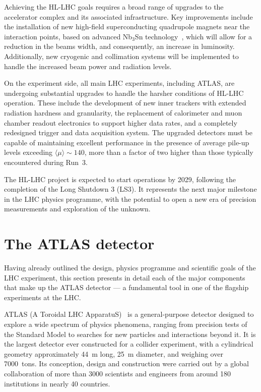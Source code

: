 Achieving the HL-LHC goals requires a broad range of upgrades to the accelerator complex and its associated infrastructure. Key improvements include the installation of new high-field superconducting quadrupole magnets near the interaction points, based on advanced Nb$_3$Sn technology~\cite{Mangiarotti:2770766}, which will allow for a reduction in the beams width, and consequently, an increase in luminosity. Additionally, new cryogenic and collimation systems will be implemented to handle the increased beam power and radiation levels.

On the experiment side, all main LHC experiments, including ATLAS, are undergoing substantial upgrades to handle the harsher conditions of HL-LHC operation. These include the development of new inner trackers with extended radiation hardness and granularity, the replacement of calorimeter and muon chamber readout electronics to support higher data rates, and a completely redesigned trigger and data acquisition system. The upgraded detectors must be capable of maintaining excellent performance in the presence of average pile-up levels exceeding $\langle\mu\rangle \sim 140$, more than a factor of two higher than those typically encountered during Run~3.

The HL-LHC project is expected to start operations by 2029, following the completion of the Long Shutdown 3 (LS3). It represents the next major milestone in the LHC physics programme, with the potential to open a new era of precision measurements and exploration of the unknown.


\section{The ATLAS detector}
\label{sec:ATLAS}

Having already outlined the design, physics programme and scientific goals of the LHC experiment, this section presents in detail each of the major components that make up the ATLAS detector — a fundamental tool in one of the flagship experiments at the LHC. 

ATLAS (A Toroidal LHC ApparatuS)~\cite{ATLAS:exp,ATLAS:1999uwa} is a general-purpose detector designed to explore a wide spectrum of physics phenomena, ranging from precision tests of the Standard Model to searches for new particles and interactions beyond it. It is the largest 
detector ever constructed for a collider experiment, with a cylindrical geometry approximately 44~m long, 25~m diameter, and weighing over 7000~tons. Its conception, design and construction were carried out by a global collaboration of more than 3000 scientists and engineers from around 180 institutions in nearly 40 countries.

